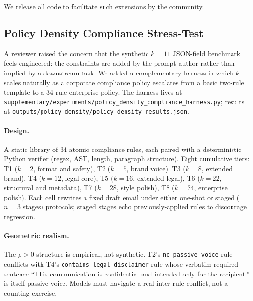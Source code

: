 \documentclass{article}
\theoremstyle{plain}
\theoremstyle{definition}
\theoremstyle{remark}
\begin{document}
We release all code to facilitate such extensions by the community.

\subsection{Policy Density Compliance Stress-Test}\label{app:policy_density}

A reviewer raised the concern that the synthetic $k=11$ JSON-field benchmark feels engineered: the constraints are added by the prompt author rather than implied by a downstream task. We added a complementary harness in which $k$ scales naturally as a corporate compliance policy escalates from a basic two-rule template to a 34-rule enterprise policy. The harness lives at \texttt{supplementary/experiments/policy\_density\_compliance\_harness.py}; results at \texttt{outputs/policy\_density/policy\_density\_results.json}.

\paragraph{Design.} A static library of 34 atomic compliance rules, each paired with a deterministic Python verifier (regex, AST, length, paragraph structure). Eight cumulative tiers: T1 ($k{=}2$, format and safety), T2 ($k{=}5$, brand voice), T3 ($k{=}8$, extended brand), T4 ($k{=}12$, legal core), T5 ($k{=}16$, extended legal), T6 ($k{=}22$, structural and metadata), T7 ($k{=}28$, style polish), T8 ($k{=}34$, enterprise polish). Each cell rewrites a fixed draft email under either one-shot or staged ($n{=}3$ stages) protocols; staged stages echo previously-applied rules to discourage regression.

\paragraph{Geometric realism.} The $\rho > 0$ structure is empirical, not synthetic. T2's \texttt{no\_passive\_voice} rule conflicts with T4's \texttt{contains\_legal\_disclaimer} rule whose verbatim required sentence ``This communication is confidential and intended only for the recipient.'' is itself passive voice. Models must navigate a real inter-rule conflict, not a counting exercise.
\end{document}
